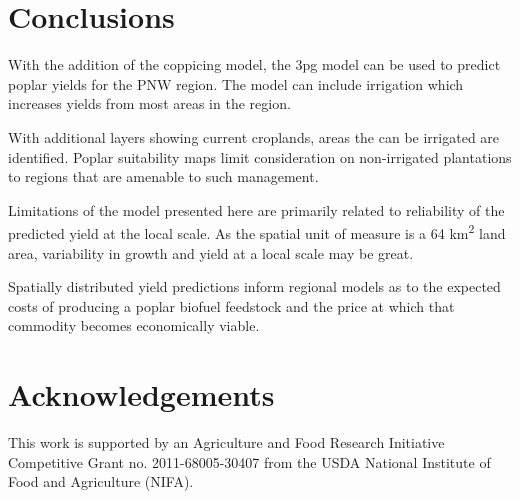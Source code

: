 \documentclass[preprint,12pt]{elsarticle}
\begin{document}
\section{Conclusions}
\label{sec:conclude}

With the addition of the coppicing model, the \ac{3pg} model can be
used to predict poplar yields for the \ac{PNW} region.  The model can
include irrigation which increases yields from most areas in the region.  

With additional layers showing current croplands, areas the can be
irrigated are identified.  Poplar suitability maps limit consideration
on non-irrigated plantations to regions that are amenable to such
management.

Limitations of the model presented here are primarily related to
reliability of the predicted yield at the local scale. As the spatial
unit of measure is a 64 km\textsuperscript{2} land area, variability
in growth and yield at a local scale may be great.

Spatially distributed yield predictions inform regional models as to
the expected costs of producing a poplar biofuel feedstock and the
price at which that commodity becomes economically viable.

\section{Acknowledgements}
This work is supported by an Agriculture and Food Research Initiative
Competitive Grant no. 2011-68005-30407 from the USDA National
Institute of Food and Agriculture (NIFA).



 


\end{document}
